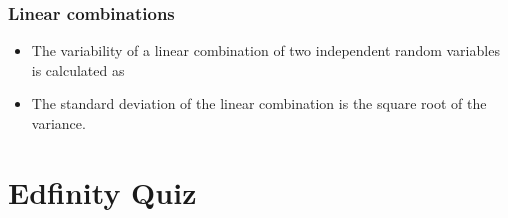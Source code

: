 \documentclass[slidestop,compress,mathserif]{beamer}
\newcommand{\soln}[1]{\textit{#1}}
\begin{document}

\begin{frame}
\frametitle{Linear combinations}

\begin{itemize}

\item The variability of a linear combination of two independent random variables is calculated as
\formula{\[ V(aX + bY) = a^2 \times V(X) + b^2 \times V(Y) \]}

\pause 

\item The standard deviation of the linear combination is the square root of the variance.

\end{itemize}

\pause 
\vfill


\end{frame}







\section{Edfinity Quiz}
\end{document}
